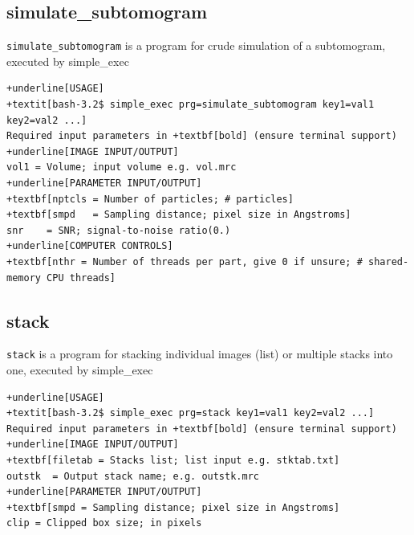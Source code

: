 \documentclass[a4paper,11pt]{article}
\newcommand{\prgname}[1]{\textcolor{NavyBlue}{\texttt{#1}}}
\begin{document}
\subsection{simulate\_subtomogram}
\label{simulate_subtomogram}
\prgname{simulate\_subtomogram} is a program for crude simulation of a subtomogram, executed by simple\_exec
\begin{Verbatim}[commandchars=+\[\],fontsize=\small,breaklines=true]
+underline[USAGE]
+textit[bash-3.2$ simple_exec prg=simulate_subtomogram key1=val1 key2=val2 ...]
Required input parameters in +textbf[bold] (ensure terminal support)
+underline[IMAGE INPUT/OUTPUT]
vol1 = Volume; input volume e.g. vol.mrc
+underline[PARAMETER INPUT/OUTPUT]
+textbf[nptcls = Number of particles; # particles]
+textbf[smpd   = Sampling distance; pixel size in Angstroms]
snr    = SNR; signal-to-noise ratio(0.)
+underline[COMPUTER CONTROLS]
+textbf[nthr = Number of threads per part, give 0 if unsure; # shared-memory CPU threads]
\end{Verbatim}

\subsection{stack}
\label{stack}
\prgname{stack} is a program for stacking individual images (list) or multiple stacks into one, executed by simple\_exec
\begin{Verbatim}[commandchars=+\[\],fontsize=\small,breaklines=true]
+underline[USAGE]
+textit[bash-3.2$ simple_exec prg=stack key1=val1 key2=val2 ...]
Required input parameters in +textbf[bold] (ensure terminal support)
+underline[IMAGE INPUT/OUTPUT]
+textbf[filetab = Stacks list; list input e.g. stktab.txt]
outstk  = Output stack name; e.g. outstk.mrc
+underline[PARAMETER INPUT/OUTPUT]
+textbf[smpd = Sampling distance; pixel size in Angstroms]
clip = Clipped box size; in pixels
\end{Verbatim}
\end{document}

